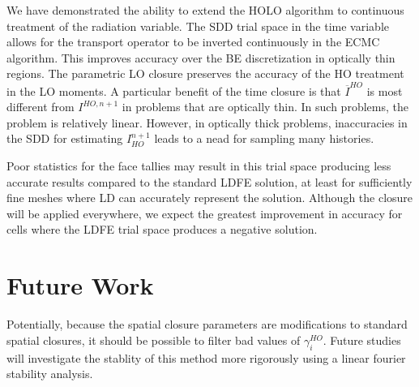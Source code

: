 We have demonstrated the ability to extend the HOLO algorithm to continuous treatment of the radiation 
variable.  The SDD trial space in the time variable allows for the transport operator to be inverted
continuously in the ECMC algorithm.  This improves accuracy over the BE discretization in optically thin regions.
The parametric LO closure preserves the accuracy of the HO treatment in the LO moments. 
A particular benefit of the time closure is that $\overline I^{HO}$ is most different
from $I^{HO,n+1}$ in problems that are optically thin.  In such problems,
the problem is relatively linear.  However, in optically thick problems, inaccuracies
in the SDD for estimating $I_{HO}^{n+1}$ leads to a nead for sampling many histories.

Poor statistics for the face tallies may result in this trial space producing less
accurate results compared to the standard LDFE solution, at least for sufficiently fine meshes where LD
can accurately represent the solution.  Although the closure will be applied everywhere,
we expect the greatest improvement in accuracy for cells where the LDFE trial space
produces a negative solution.



\section{Future Work} 

Potentially, because the spatial closure parameters are modifications to standard spatial closures, it should be possible to filter bad
values of $\gamma^{HO}_i$.  Future studies will investigate the stablity of
this method more rigorously using a linear fourier stability analysis.

